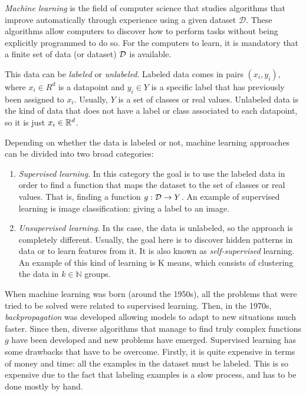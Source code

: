 \label{Chapter:Intro:Rep:Learning}

\emph{Machine learning} is the field of computer science that studies algorithms that improve automatically through experience using a given dataset $\mathcal D$. 
These algorithms allow computers to discover how to
perform tasks without being explicitly programmed to do so. For the computers to learn, it is mandatory that a finite set of data (or dataset) $\mathcal{D}$ is available. 

This data can be \emph{labeled} or \emph{unlabeled}. Labeled data comes in pairs $(x_i,y_i)$, where $x_i \in R^d$ is a datapoint and $y_i \in Y$ is a specific label that has previously been assigned to $x_i$. Usually, $Y$ is a set of classes or real values.
Unlabeled data is the kind of data that does not have a label or class associated to each datapoint, so it is just $x_i \in \mathbb{R}^d$. 

Depending on whether the data is labeled or not, machine learning approaches can be divided into two broad categories:
\begin{enumerate}
    \item \emph{Supervised learning}. In this category the goal is to use the labeled data in order to find a function that maps the dataset to the set of classes or real values. That is, finding a function $g:\mathcal{D} \to Y$. 
    An example of supervised learning is image classification: giving a label to an image.
    \item \emph{Unsupervised learning}. In ths case, the data is unlabeled, so the approach is completely different. Usually, the goal here is to discover hidden patterns in data or to learn features from it. It is also known as \emph{self-supervised} learning.
    An example of this kind of learning is K means, which consists of clustering the data in $k \in \mathbb N$ groups. 

\end{enumerate}

When machine learning was born (around the 1950s), all the problems that were tried to be solved were related to supervised learning. Then, in the 1970s, \emph{backpropagation} was developed allowing models to adapt to new situations much faster. Since then, diverse algorithms that manage to find truly complex functions $g$ have been developed and new problems have emerged. Supervised learning has some drawbacks that have to be overcome. Firstly, it is quite expensive in terms of money and time: all the examples in the dataset must be labeled. This is so expensive due to the fact that labeling examples is a slow process, and has to be done mostly by hand. 

